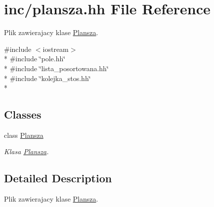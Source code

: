 \hypertarget{plansza_8hh}{\section{inc/plansza.hh File Reference}
\label{plansza_8hh}
}


Plik zawierajacy klase \hyperlink{class_plansza}{Plansza}.  


{\ttfamily \#include $<$iostream$>$}\\*
{\ttfamily \#include \char`\"{}pole.\+hh\char`\"{}}\\*
{\ttfamily \#include \char`\"{}lista\+\_\+posortowana.\+hh\char`\"{}}\\*
{\ttfamily \#include \char`\"{}kolejka\+\_\+stos.\+hh\char`\"{}}\\*
\subsection*{Classes}
\begin{DoxyCompactItemize}
\item 
class \hyperlink{class_plansza}{Plansza}
\begin{DoxyCompactList}\small\item\em Klasa \hyperlink{class_plansza}{Plansza}. \end{DoxyCompactList}\end{DoxyCompactItemize}


\subsection{Detailed Description}
Plik zawierajacy klase \hyperlink{class_plansza}{Plansza}. 

